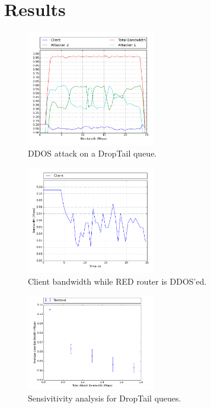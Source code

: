 \documentclass[12pt,twocolumn]{article}
\begin{document}
\section{Results}
\begin{figure}[t!]
    \centering
    \includegraphics[width=0.5\textwidth]{../Results/tbf.png} \caption{DDOS attack on a DropTail queue.} \label{tbf1}
\end{figure}

\begin{figure}[t!]
    \centering
    \includegraphics[width=0.5\textwidth]{../Results/red_client.png} \caption{Client bandwidth while RED router is DDOS'ed.} \label{red1}
\end{figure}


\begin{figure}[h!]
    \centering
    \includegraphics[width=0.5\textwidth]{../Results/result-tbf.png} \caption{Sensivitivity analysis for DropTail queues.} \label{tbf2}
\end{figure}
\end{document}
